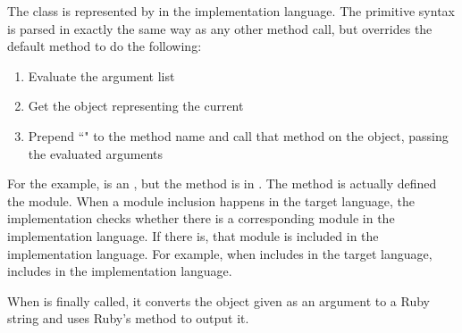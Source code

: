 The  class is represented by  in the implementation language. The primitive syntax is parsed in exactly the same way as any other method call, but \- overrides the default  method to do the following:

\begin{enumerate}
  \item Evaluate the argument list
  \item Get the object representing the current 
  \item Prepend ``" to the method name and call that method on the object, passing the evaluated arguments
\end{enumerate}

For the example,  is an , but the method is in . The  method is actually defined the  module. When a module inclusion happens in the target language, the implementation checks whether there is a corresponding module in the implementation language. If there is, that module is included in the implementation language. For example, when  includes  in the target language,  includes  in the implementation language.

When  is finally called, it converts the object given as an argument to a Ruby string and uses Ruby's  method to output it.
